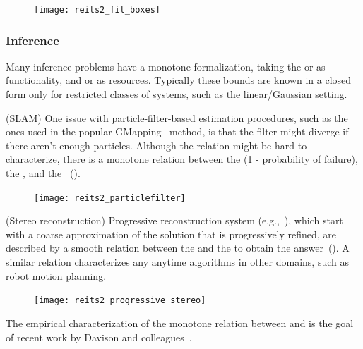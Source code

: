 \begin{figure}[h]
    \centering
\texttt{[image: reits2\_fit\_boxes]}
\caption{\label{fig:packing}}
\end{figure}


\subsubsection{Inference}

Many inference problems have a monotone formalization, taking the
 or  as functionality, and 
or  as resources. Typically these bounds are known in
a closed form only for restricted classes of systems, such as the
linear/Gaussian setting.

\begin{example}
(SLAM) One issue with particle-filter-based estimation procedures,
such as the ones used in the popular GMapping~\cite{grisetti07improved}
method, is that the filter might diverge if there aren't enough particles.
Although the relation might be hard to characterize, there is a monotone
relation between the  (1 - probability of failure),
the , and the ~().
\end{example}

\begin{figure}[h]
    \centering
\texttt{[image: reits2\_particlefilter]}
\caption{\label{fig:gmapping} }
\end{figure}



\begin{example}
(Stereo reconstruction) Progressive reconstruction system (e.g.,~\cite{locher16progressive}),
which start with a coarse approximation of the solution that is progressively
refined, are described by a smooth relation between the 
and the  to obtain the answer~().
A similar relation characterizes any anytime algorithms in other domains,
such as robot motion planning.
\end{example}

\begin{figure}[h]
    \centering
    \texttt{[image: reits2\_progressive\_stereo]}
    \caption{\label{fig:progressive}}
\end{figure}

\begin{example}
The empirical characterization of the monotone relation between  and 
is the goal of recent work by Davison and colleagues~\cite{nardi15introducing,zia16comparative}.
\end{example}


